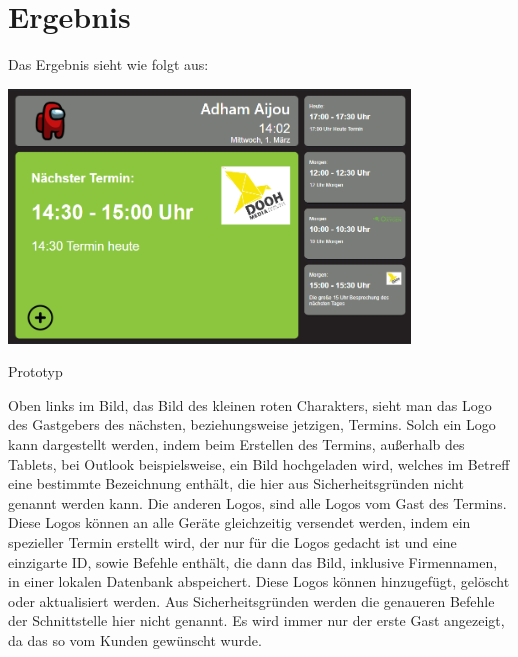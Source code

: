 
\newpage
\section{Ergebnis}\label{sec:ergebnis}
Das Ergebnis sieht wie folgt aus:
\par\vspace{1cm}
    \centering
    \includegraphics[width=0.8\textwidth]{Bilder/Ergebnis}
    \caption{Prototyp}
    \label{fig:Prototyp}
\par\vspace{1cm}
\raggedright
\newline
Oben links im Bild, das Bild des kleinen roten Charakters, sieht man das Logo des Gastgebers des nächsten, beziehungsweise jetzigen, Termins.
Solch ein Logo kann dargestellt werden, indem beim Erstellen des Termins, außerhalb des Tablets, bei Outlook beispielsweise, ein Bild hochgeladen wird, welches im Betreff eine bestimmte Bezeichnung enthält, die hier aus Sicherheitsgründen nicht genannt werden kann.
\newline
Die anderen Logos, sind alle Logos vom Gast des Termins.
Diese Logos können an alle Geräte gleichzeitig versendet werden, indem ein spezieller Termin erstellt wird, der nur für die Logos gedacht ist und eine einzigarte ID, sowie Befehle enthält, die dann das Bild, inklusive Firmennamen, in einer lokalen Datenbank abspeichert.
Diese Logos können hinzugefügt, gelöscht oder aktualisiert werden.
Aus Sicherheitsgründen werden die genaueren Befehle der Schnittstelle hier nicht genannt.
\newline
Es wird immer nur der erste Gast angezeigt, da das so vom Kunden gewünscht wurde.